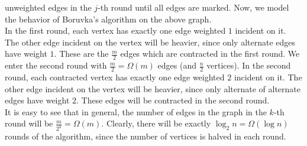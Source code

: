 \documentclass[9pt]{article}
\begin{document}
unweighted edges in the $j$-th round until all edges are marked. Now, we model the
behavior of Boruvka's algorithm on the above graph. \\
In the first round, each vertex has exactly one edge weighted $1$ incident on it. The
other edge incident on the vertex will be heavier, since only alternate edges have
weight $1$. These are the $\frac{m}{2}$ edges which are contracted in the first round.
We enter the second round with $\frac{m}{2} = \Omega(m)$ edges (and $\frac{n}{2}$
vertices). In the second round, each contracted vertex has exactly one edge weighted
$2$ incident on it. The other edge incident on the vertex will be heavier, since only
alternate of alternate edges have weight $2$. These edges will be contracted in the
second round. \\
It is easy to see that in general, the number of edges in the graph in the $k$-th
round will be $\frac{m}{2^{k}} = \Omega(m)$. Clearly, there will be exactly
$\log_{2}{n} = \Omega(\log{n})$ rounds of the algorithm, since the number of
vertices is halved in each round.
\end{document}
